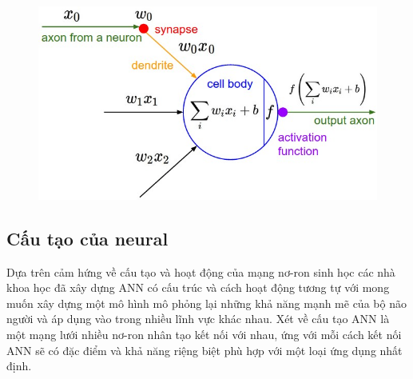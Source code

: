 \begin{center}
    \begin{figure}[H]
    \centering
    \includegraphics[width=0.6\columnwidth]{images/chap2/neuron_model.jpeg}
    \label{chap2:neural_model}
    \end{figure}
\end{center}


\subsection{Cấu tạo của neural}
Dựa trên cảm hứng về cấu tạo và hoạt động của mạng nơ-ron sinh học các nhà khoa học đã xây dựng ANN có cấu trúc và cách hoạt động tương tự với mong muốn xây dựng một mô hình mô phỏng lại những khả năng mạnh mẽ của bộ não người và áp dụng vào trong nhiều lĩnh vực khác nhau. Xét về cấu tạo ANN là một mạng lưới nhiều nơ-ron nhân tạo kết nối với nhau, ứng với mỗi cách kết nối ANN sẽ có đặc điểm và khả năng riệng biệt phù hợp với một loại ứng dụng nhất định.

